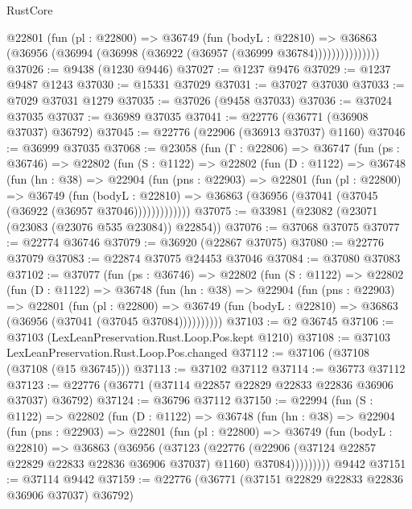 \begin{lexlean}{RustCore}
\begin{coremodule}
                @22801
                  (fun (pl : @22800) =>
                  @36749
                    (fun (bodyL : @22810) =>
                    @36863 (@36956 (@36994 (@36998 (@36922 (@36957 (@36999 @36784)))))))))))))))
@37026 := @9438 (@1230 @9446)
@37027 := @1237 @9476
@37029 := @1237 @9487 @1243
@37030 := @15331 @37029
@37031 := @37027 @37030
@37033 := @7029 @37031 @1279
@37035 := @37026 (@9458 @37033)
@37036 := @37024 @37035
@37037 := @36989 @37035
@37041 := @22776 (@36771 (@36908 @37037) @36792)
@37045 := @22776 (@22906 (@36913 @37037) @1160)
@37046 := @36999 @37035
@37068 := @23058
    (fun (Γ : @22806) =>
    @36747
      (fun (ps : @36746) =>
      @22802
        (fun (S : @1122) =>
        @22802
          (fun (D : @1122) =>
          @36748
            (fun (hn : @38) =>
            @22904
              (fun (pns : @22903) =>
              @22801
                (fun (pl : @22800) =>
                @36749
                  (fun (bodyL : @22810) =>
                  @36863 (@36956 (@37041 (@37045 (@36922 (@36957 @37046)))))))))))))
@37075 := @33981 (@23082 (@23071 (@23083 (@23076 @535 @23084)) @22854))
@37076 := @37068 @37075
@37077 := @22774 @36746
@37079 := @36920 (@22867 @37075)
@37080 := @22776 @37079
@37083 := @22874 @37075 @24453 @37046
@37084 := @37080 @37083
@37102 := @37077
    (fun (ps : @36746) =>
    @22802
      (fun (S : @1122) =>
      @22802
        (fun (D : @1122) =>
        @36748
          (fun (hn : @38) =>
          @22904
            (fun (pns : @22903) =>
            @22801
              (fun (pl : @22800) =>
              @36749 (fun (bodyL : @22810) => @36863 (@36956 (@37041 (@37045 @37084))))))))))
@37103 := @2 @36745
@37106 := @37103 (LexLeanPreservation.Rust.Loop.Pos.kept @1210)
@37108 := @37103 LexLeanPreservation.Rust.Loop.Pos.changed
@37112 := @37106 (@37108 (@37108 (@15 @36745)))
@37113 := @37102 @37112
@37114 := @36773 @37112
@37123 := @22776 (@36771 (@37114 @22857 @22829 @22833 @22836 @36906 @37037) @36792)
@37124 := @36796 @37112
@37150 := @22994
    (fun (S : @1122) =>
    @22802
      (fun (D : @1122) =>
      @36748
        (fun (hn : @38) =>
        @22904
          (fun (pns : @22903) =>
          @22801
            (fun (pl : @22800) =>
            @36749
              (fun (bodyL : @22810) =>
              @36863
                (@36956
                  (@37123
                    (@22776
                      (@22906 (@37124 @22857 @22829 @22833 @22836 @36906 @37037) @1160)
                      @37084)))))))))
    @9442
@37151 := @37114 @9442
@37159 := @22776 (@36771 (@37151 @22829 @22833 @22836 @36906 @37037) @36792)

\end{coremodule}
\end{lexlean}

